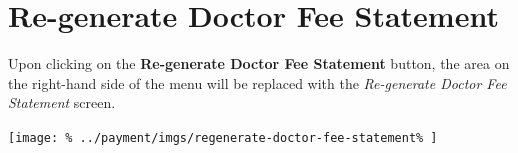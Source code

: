 \documentclass[../main/main]{subfiles}
\begin{document}
\newpage
\section{Re-generate Doctor Fee Statement}
\label{sec:re-generate-doctor-fee-statement}

Upon clicking on the \textbf{Re-generate Doctor Fee Statement} button,
the area on the right-hand side of the menu will be replaced with the
\emph{Re-generate Doctor Fee Statement} screen.

\texttt{[image: \%
  ../payment/imgs/regenerate-doctor-fee-statement\%
]}
\end{document}
